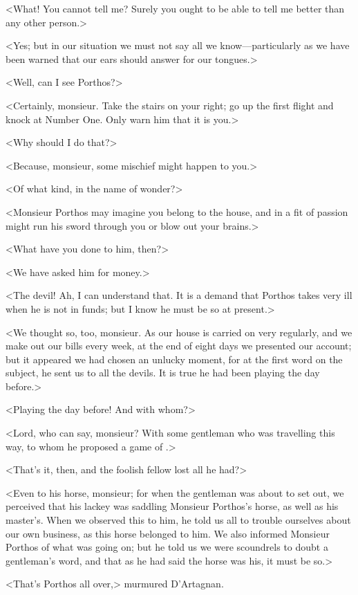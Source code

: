 <What! You cannot tell me? Surely you ought to be able to tell me better than any other person.> 

<Yes; but in our situation we must not say all we know—particularly as we have been warned that our ears should answer for our tongues.> 

<Well, can I see Porthos?> 

<Certainly, monsieur. Take the stairs on your right; go up the first flight and knock at Number One. Only warn him that it is you.> 

<Why should I do that?> 

<Because, monsieur, some mischief might happen to you.> 

<Of what kind, in the name of wonder?> 

<Monsieur Porthos may imagine you belong to the house, and in a fit of passion might run his sword through you or blow out your brains.> 

<What have you done to him, then?> 

<We have asked him for money.> 

<The devil! Ah, I can understand that. It is a demand that Porthos takes very ill when he is not in funds; but I know he must be so at present.> 

<We thought so, too, monsieur. As our house is carried on very regularly, and we make out our bills every week, at the end of eight days we presented our account; but it appeared we had chosen an unlucky moment, for at the first word on the subject, he sent us to all the devils. It is true he had been playing the day before.> 

<Playing the day before! And with whom?> 

<Lord, who can say, monsieur? With some gentleman who was travelling this way, to whom he proposed a game of .> 

<That's it, then, and the foolish fellow lost all he had?> 

<Even to his horse, monsieur; for when the gentleman was about to set out, we perceived that his lackey was saddling Monsieur Porthos's horse, as well as his master's. When we observed this to him, he told us all to trouble ourselves about our own business, as this horse belonged to him. We also informed Monsieur Porthos of what was going on; but he told us we were scoundrels to doubt a gentleman's word, and that as he had said the horse was his, it must be so.> 

<That's Porthos all over,> murmured D'Artagnan. 


